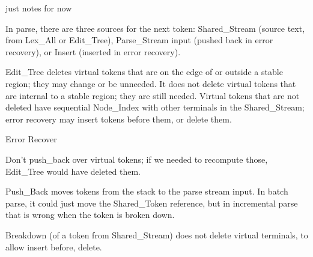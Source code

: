 just notes for now

In parse, there are three sources for the next token: Shared\_Stream
(source text, from Lex\_All or Edit\_Tree), Parse\_Stream input
(pushed back in error recovery), or Insert (inserted in error
recovery).

Edit\_Tree deletes virtual tokens that are on the edge of or outside a stable
region; they may change or be unneeded. It does not delete virtual tokens that are
internal to a stable region; they are still needed. Virtual tokens
that are not deleted have sequential Node\_Index with other terminals
in the Shared\_Stream; error recovery may insert tokens before them,
or delete them.

Error Recover

Don't push\_back over virtual tokens; if we needed to recompute those,
Edit\_Tree would have deleted them.

Push\_Back moves tokens from the stack to the parse stream input. In
batch parse, it could just move the Shared\_Token reference, but in
incremental parse that is wrong when the token is broken down.

Breakdown (of a token from Shared\_Stream) does not delete virtual
terminals, to allow insert before, delete.
